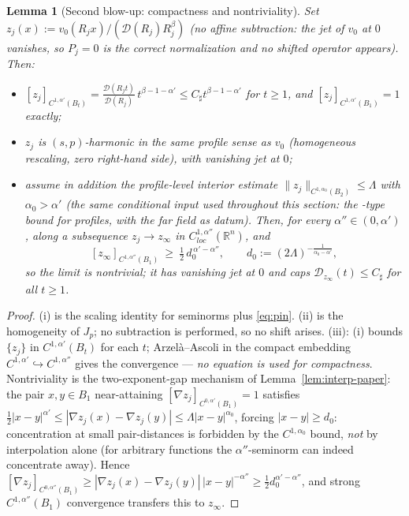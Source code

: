 \documentclass[11pt]{amsart}
\theoremstyle{plain}
\newtheorem{lemma}[theorem]{Lemma}
\theoremstyle{definition}
\theoremstyle{remark}
\newcommand{\R}{\mathbb{R}}
\newcommand{\al}{\alpha}
\begin{document}
\begin{lemma}[Second blow-up: compactness and nontriviality]\label{lem:z}
Set $z_j(x):=v_0(R_jx)/(\mathcal D(R_j)R_j^{\beta})$ \textnormal{(}no
affine subtraction: the jet of $v_0$ at $0$ vanishes, so $P_j=0$ is the
correct normalization and no shifted operator appears\textnormal{)}. Then:
\begin{itemize}[leftmargin=2em]
\item[\textnormal{(i)}] $[z_j]_{C^{1,\al'}(B_t)}
  =\frac{\mathcal D(R_jt)}{\mathcal D(R_j)}\,t^{\beta-1-\al'}
  \le C_\sharp t^{\beta-1-\al'}$ for $t\ge1$, and
  $[z_j]_{C^{1,\al'}(B_1)}=1$ exactly;
\item[\textnormal{(ii)}] $z_j$ is $(s,p)$-harmonic in the same profile
  sense as $v_0$ \textnormal{(}homogeneous rescaling, zero right-hand
  side\textnormal{)}, with vanishing jet at $0$;
\item[\textnormal{(iii)}] assume in addition the profile-level interior
  estimate $\|z_j\|_{C^{1,\al_0}(B_2)}\le\Lambda$ with $\al_0>\al'$
  \textnormal{(}the same conditional input used throughout this section:
  the \cite{GJS}-type bound for profiles, with the far field as
  datum\textnormal{)}. Then, for every $\al''\in(0,\al')$, along a
  subsequence $z_j\to z_\infty$ in $C^{1,\al''}_{loc}(\R^n)$, and
\[
  [z_\infty]_{C^{1,\al''}(B_1)}\ \ge\
  \tfrac12\,d_0^{\,\al'-\al''},\qquad
  d_0:=(2\Lambda)^{-\frac1{\al_0-\al'}} ,
\]
so the limit is nontrivial; it has vanishing jet at $0$ and caps
$\mathcal D_{z_\infty}(t)\le C_\sharp$ for all $t\ge1$.
\end{itemize}
\end{lemma}
\begin{proof}
(i) is the scaling identity for seminorms plus \eqref{eq:pin}. (ii) is the
homogeneity of $J_p$; no subtraction is performed, so no shift arises.
(iii): (i) bounds $\{z_j\}$ in $C^{1,\al'}(B_t)$ for each $t$;
Arzel\`a--Ascoli in the compact embedding
$C^{1,\al'}\hookrightarrow C^{1,\al''}$ gives the convergence --- \emph{no
equation is used for compactness}. Nontriviality is the two-exponent-gap
mechanism of Lemma~\ref{lem:interp-paper}: the pair $x,y\in B_1$
near-attaining $[\nabla z_j]_{C^{0,\al'}(B_1)}=1$ satisfies
$\tfrac12|x-y|^{\al'}\le|\nabla z_j(x)-\nabla z_j(y)|\le\Lambda|x-y|^{\al_0}$,
forcing $|x-y|\ge d_0$: concentration at small pair-distances is forbidden
by the $C^{1,\al_0}$ bound, \emph{not} by interpolation alone
\textnormal{(}for arbitrary functions the $\al''$-seminorm can indeed
concentrate away\textnormal{)}. Hence
$[\nabla z_j]_{C^{0,\al''}(B_1)}\ge|\nabla z_j(x)-\nabla z_j(y)|\,|x-y|^{-\al''}
\ge\tfrac12 d_0^{\al'-\al''}$, and strong $C^{1,\al''}(B_1)$ convergence
transfers this to $z_\infty$.
\end{proof}
\end{document}
